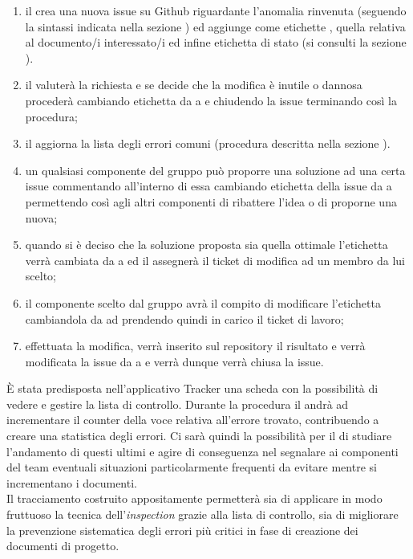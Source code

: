 				\begin{enumerate}
				    \item il  crea una nuova issue su Github riguardante l'anomalia rinvenuta (seguendo la sintassi indicata nella sezione ) ed aggiunge come etichette , quella relativa al documento/i interessato/i ed infine etichetta di stato  (si consulti la sezione ).
				    \item il  valuterà la richiesta e se decide che la modifica è inutile o dannosa procederà cambiando etichetta da  a  e chiudendo la issue terminando così la procedura;
				    \item il  aggiorna la lista degli errori comuni (procedura descritta nella sezione ).
				    \item un qualsiasi componente del gruppo può proporre una soluzione ad una certa issue commentando all'interno di essa cambiando etichetta della issue da  a  permettendo così agli altri componenti di ribattere l'idea o di proporne una nuova;
				    \item quando si è deciso che la soluzione proposta sia quella ottimale l'etichetta verrà cambiata da  a  ed il  assegnerà il ticket di modifica ad un membro da lui scelto;
				    \item il componente scelto dal gruppo avrà il compito di modificare l'etichetta cambiandola da  ad  prendendo quindi in carico il ticket di lavoro;
				    \item effettuata la modifica, verrà inserito sul repository il risultato e verrà modificata la issue da  a  e verrà dunque verrà chiusa la issue.
			\end{enumerate}
				\label{sec:tracciamento}
					È stata predisposta nell'applicativo Tracker una scheda con la possibilità di vedere e gestire la lista di controllo. Durante la procedura il  andrà ad incrementare il counter della voce relativa all'errore trovato, contribuendo a creare una statistica degli errori. Ci sarà quindi la possibilità per il  di studiare l'andamento di questi ultimi e agire di conseguenza nel segnalare ai componenti del team eventuali situazioni particolarmente frequenti da evitare mentre si incrementano i documenti.\\ Il tracciamento costruito appositamente permetterà sia di applicare in modo fruttuoso la tecnica dell'\textit{inspection} grazie alla lista di controllo, sia di migliorare la prevenzione sistematica degli errori più critici in fase di creazione dei documenti di progetto.
